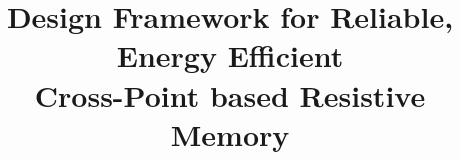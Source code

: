 \documentclass[9pt,conference,twocolumn]{IEEEtran}
\begin{document}
\title{Design Framework for Reliable, Energy Efficient \\Cross-Point based Resistive Memory}
\maketitle






%





\end{document}
